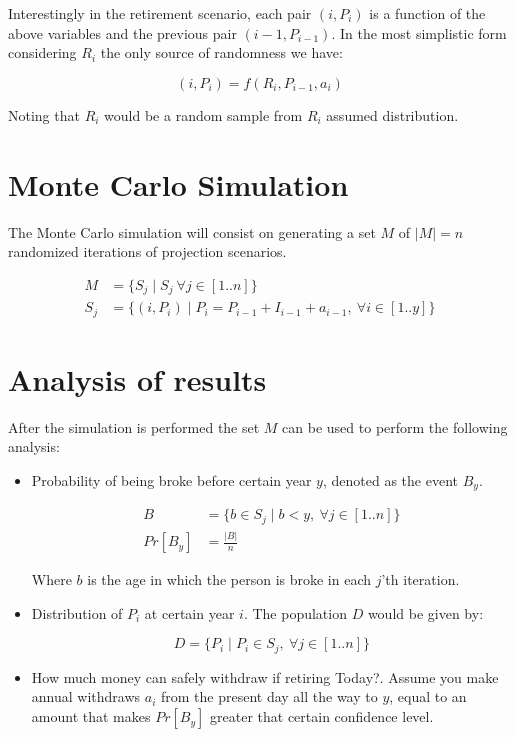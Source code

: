 \documentclass[10pt]{article}
\begin{document}
Interestingly in the retirement scenario, each pair $(i,P_i)$ is a function of the above variables and the previous pair $(i-1,P_{i-1})$.  In the most simplistic form considering \textbf{$R_i$} the only source of randomness we have:

\[ (i,P_i) = f(R_i, P_{i-1}, a_i) \]

Noting that $R_i$ would be a random sample from $R_i$ assumed distribution.

\section{Monte Carlo Simulation}

The Monte Carlo simulation will consist on generating a set $M$ of $|M|=n$ randomized iterations of projection scenarios.  

\begin{align*}
M & = \{ S_j \mid S_j ~ \forall j \in [1..n] \} \\
S_j & = \{(i,P_i) \mid  P_{i} = P_{i-1} + I_{i-1} + a_{i-1}, ~ \forall i \in [1..y] \}
\end{align*}

\section{Analysis of results}


After the simulation is performed the set $M$ can be used to perform the following analysis:

\begin{itemize}
\item Probability of being broke before certain year $y$, denoted as the event $B_y$.

\begin{align*}
B & = \{b \in S_j\mid b < y, ~ \forall j \in [1..n] \} \\
Pr[B_y] & = \frac{|B|}{n}
\end{align*}

Where $b$ is the age in which the person is broke in each $j$'th iteration.

\item Distribution of $P_i$ at certain year $i$.  The population $D$ would be given by:

\[D=\{P_i \mid P_i \in S_j, ~\forall j \in [1..n] \}\]

\item How much money can safely withdraw if retiring Today?.  Assume you make annual withdraws $a_i$ from the present day all the way to $y$, equal to an amount that makes $Pr[B_y]$ greater that certain confidence level.

\end{itemize}
\end{document}
